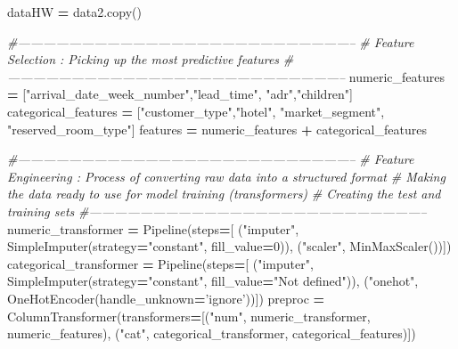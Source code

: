 \documentclass[10pt,a4paper]{article}
\newenvironment{Shaded}{\begin{snugshade}}{\end{snugshade}}
\newcommand{\CommentTok}[1]{\textcolor[rgb]{0.56,0.35,0.01}{\textit{#1}}}
\newcommand{\DecValTok}[1]{\textcolor[rgb]{0.00,0.00,0.81}{#1}}
\newcommand{\NormalTok}[1]{#1}
\newcommand{\OperatorTok}[1]{\textcolor[rgb]{0.81,0.36,0.00}{\textbf{#1}}}
\newcommand{\StringTok}[1]{\textcolor[rgb]{0.31,0.60,0.02}{#1}}
\theoremstyle{break}
\begin{document}
\begin{Shaded}
\begin{Highlighting}[]
\NormalTok{dataHW }\OperatorTok{=}\NormalTok{ data2.copy()}

\CommentTok{#--------------------------------------------------------------------------------}
\CommentTok{# Feature Selection : Picking up the most predictive features }
\CommentTok{#--------------------------------------------------------------------------------}
\NormalTok{numeric_features }\OperatorTok{=}\NormalTok{ [}\StringTok{"arrival_date_week_number"}\NormalTok{,}\StringTok{"lead_time"}\NormalTok{, }\StringTok{"adr"}\NormalTok{,}\StringTok{"children"}\NormalTok{]}
\NormalTok{categorical_features }\OperatorTok{=}\NormalTok{ [}\StringTok{"customer_type"}\NormalTok{,}\StringTok{"hotel"}\NormalTok{, }\StringTok{"market_segment"}\NormalTok{, }\StringTok{"reserved_room_type"}\NormalTok{]                       }
\NormalTok{features }\OperatorTok{=}\NormalTok{ numeric_features }\OperatorTok{+}\NormalTok{ categorical_features}

\CommentTok{#--------------------------------------------------------------------------------}
\CommentTok{# Feature Engineering : Process of converting raw data into a structured format }
\CommentTok{# Making the data ready to use for model training (transformers)}
\CommentTok{# Creating the test and training sets}
\CommentTok{#--------------------------------------------------------------------------------}
\NormalTok{numeric_transformer }\OperatorTok{=}\NormalTok{ Pipeline(steps}\OperatorTok{=}\NormalTok{[}
\NormalTok{                                    (}\StringTok{"imputer"}\NormalTok{, SimpleImputer(strategy}\OperatorTok{=}\StringTok{"constant"}\NormalTok{, fill_value}\OperatorTok{=}\DecValTok{0}\NormalTok{)),}
\NormalTok{                                    (}\StringTok{"scaler"}\NormalTok{, MinMaxScaler())]) }
\NormalTok{categorical_transformer }\OperatorTok{=}\NormalTok{ Pipeline(steps}\OperatorTok{=}\NormalTok{[}
\NormalTok{                                    (}\StringTok{"imputer"}\NormalTok{, SimpleImputer(strategy}\OperatorTok{=}\StringTok{"constant"}\NormalTok{,}
\NormalTok{                                    fill_value}\OperatorTok{=}\StringTok{"Not defined"}\NormalTok{)),}
\NormalTok{                                    (}\StringTok{"onehot"}\NormalTok{, OneHotEncoder(handle_unknown}\OperatorTok{=}\StringTok{'ignore'}\NormalTok{))])}
\NormalTok{preproc }\OperatorTok{=}\NormalTok{ ColumnTransformer(transformers}\OperatorTok{=}\NormalTok{[(}\StringTok{"num"}\NormalTok{, numeric_transformer, numeric_features),}
\NormalTok{                                          (}\StringTok{"cat"}\NormalTok{, categorical_transformer, categorical_features)])}


\end{Highlighting}
\end{Shaded}
\end{document}
